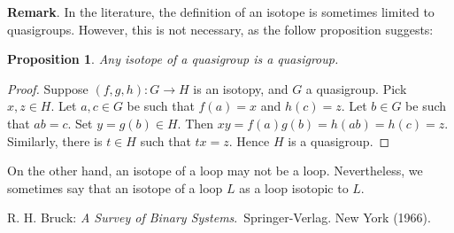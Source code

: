 \documentclass[12pt]{article}
\newtheorem{prop}{Proposition}
\begin{document}
\textbf{Remark}.  In the literature, the definition of an isotope is sometimes limited to quasigroups.  However, this is not necessary, as the follow proposition suggests:

\begin{prop}  Any isotope of a quasigroup is a quasigroup. \end{prop}
\begin{proof} Suppose $(f,g,h):G\to H$ is an isotopy, and $G$ a quasigroup.  Pick $x,z\in H$.  Let $a,c\in G$ be such that $f(a)=x$ and $h(c)=z$.  Let $b\in G$ be such that $ab=c$.  Set $y=g(b)\in H$.  Then $xy=f(a)g(b)=h(ab)=h(c)=z$.  Similarly, there is $t\in H$ such that $tx=z$.  Hence $H$ is a quasigroup. \end{proof}

On the other hand, an isotope of a loop may not be a loop.  Nevertheless, we sometimes say that an isotope of a loop $L$ as a loop isotopic to $L$.

\begin{thebibliography}{9}
 R. H. Bruck: {\em A Survey of Binary Systems}.\, Springer-Verlag. New York (1966).
\end{thebibliography}
\end{document}
